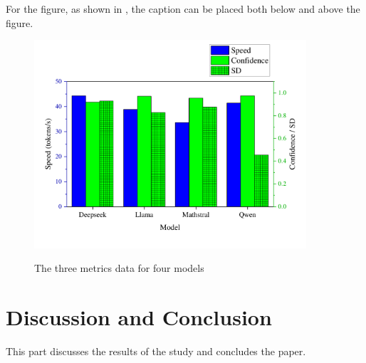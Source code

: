 \documentclass[12pt]{article}
\newcommand{\myreferences}{
    \titleformat{\section}[block]{\zihao{-4}\normalfont\centering}{\thesection}{1em}{}
}
\begin{document}
\begin{doublespace}
For the figure, as shown in , the caption can be placed both below and above the figure.

\begin{figure}[H]
    \centering
    \caption{The three metrics data for four models}
    \includegraphics[width=0.9\textwidth]{assets/Metrics.pdf}
    \label{Fig:metrics}
\end{figure}

\section{Discussion and Conclusion}

This part discusses the results of the study and concludes the paper.

\end{doublespace}

\myreferences %


\end{document}

